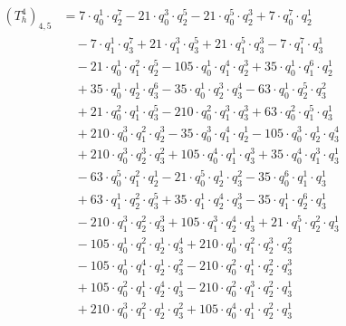 \begin{align*}(T_{h}^4)_{4,5}&=7\cdot q_0^{1}\cdot q_2^{7}-21\cdot q_0^{3}\cdot q_2^{5}-21\cdot q_0^{5}\cdot q_2^{3}+7\cdot q_0^{7}\cdot q_2^{1}\\
&\quad -7\cdot q_1^{1}\cdot q_3^{7}+21\cdot q_1^{3}\cdot q_3^{5}+21\cdot q_1^{5}\cdot q_3^{3}-7\cdot q_1^{7}\cdot q_3^{1}\\
&\quad -21\cdot q_0^{1}\cdot q_1^{2}\cdot q_2^{5}-105\cdot q_0^{1}\cdot q_1^{4}\cdot q_2^{3}+35\cdot q_0^{1}\cdot q_1^{6}\cdot q_2^{1}\\
&\quad +35\cdot q_0^{1}\cdot q_2^{1}\cdot q_3^{6}-35\cdot q_0^{1}\cdot q_2^{3}\cdot q_3^{4}-63\cdot q_0^{1}\cdot q_2^{5}\cdot q_3^{2}\\
&\quad +21\cdot q_0^{2}\cdot q_1^{1}\cdot q_3^{5}-210\cdot q_0^{2}\cdot q_1^{3}\cdot q_3^{3}+63\cdot q_0^{2}\cdot q_1^{5}\cdot q_3^{1}\\
&\quad +210\cdot q_0^{3}\cdot q_1^{2}\cdot q_2^{3}-35\cdot q_0^{3}\cdot q_1^{4}\cdot q_2^{1}-105\cdot q_0^{3}\cdot q_2^{1}\cdot q_3^{4}\\
&\quad +210\cdot q_0^{3}\cdot q_2^{3}\cdot q_3^{2}+105\cdot q_0^{4}\cdot q_1^{1}\cdot q_3^{3}+35\cdot q_0^{4}\cdot q_1^{3}\cdot q_3^{1}\\
&\quad -63\cdot q_0^{5}\cdot q_1^{2}\cdot q_2^{1}-21\cdot q_0^{5}\cdot q_2^{1}\cdot q_3^{2}-35\cdot q_0^{6}\cdot q_1^{1}\cdot q_3^{1}\\
&\quad +63\cdot q_1^{1}\cdot q_2^{2}\cdot q_3^{5}+35\cdot q_1^{1}\cdot q_2^{4}\cdot q_3^{3}-35\cdot q_1^{1}\cdot q_2^{6}\cdot q_3^{1}\\
&\quad -210\cdot q_1^{3}\cdot q_2^{2}\cdot q_3^{3}+105\cdot q_1^{3}\cdot q_2^{4}\cdot q_3^{1}+21\cdot q_1^{5}\cdot q_2^{2}\cdot q_3^{1}\\
&\quad -105\cdot q_0^{1}\cdot q_1^{2}\cdot q_2^{1}\cdot q_3^{4}+210\cdot q_0^{1}\cdot q_1^{2}\cdot q_2^{3}\cdot q_3^{2}\\
&\quad -105\cdot q_0^{1}\cdot q_1^{4}\cdot q_2^{1}\cdot q_3^{2}-210\cdot q_0^{2}\cdot q_1^{1}\cdot q_2^{2}\cdot q_3^{3}\\
&\quad +105\cdot q_0^{2}\cdot q_1^{1}\cdot q_2^{4}\cdot q_3^{1}-210\cdot q_0^{2}\cdot q_1^{3}\cdot q_2^{2}\cdot q_3^{1}\\
&\quad +210\cdot q_0^{3}\cdot q_1^{2}\cdot q_2^{1}\cdot q_3^{2}+105\cdot q_0^{4}\cdot q_1^{1}\cdot q_2^{2}\cdot q_3^{1}\end{align*}

